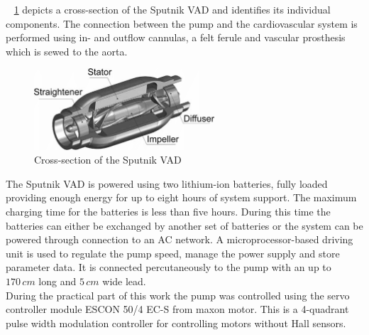 \figurename~ \ref{fig:sput_cross} depicts a cross-section of the Sputnik VAD and identifies its individual components.
The connection between the pump and the cardiovascular system is performed using in- and outflow cannulas, a felt ferule and vascular prosthesis which is sewed to the aorta. \cite{Sputnik1}
\begin{figure}[h]
  \centering
  \includegraphics[width=0.6\textwidth]{images/sputnik_cross.png}
  \caption[Cross-section of Sputnik VAD \cite{Sputnik6}]{Cross-section of the Sputnik VAD \cite{Sputnik6}}
  \label{fig:sput_cross}
\end{figure}
The Sputnik VAD is powered using two lithium-ion batteries, fully loaded providing enough energy for up to eight hours of system support. The maximum charging time for the batteries is less than five hours. During this time the batteries can either be exchanged by another set of batteries or the system can be powered through connection to an AC network. A microprocessor-based driving unit is used to regulate the pump speed, manage the power supply and store parameter data. It is connected percutaneously to the pump with an up to $170\, cm$ long and $5\, cm$ wide lead. \cite{Sputnik1}
\\During the practical part of this work the pump was controlled using the servo controller module ESCON 50/4 EC-S from maxon motor. This is a 4-quadrant pulse width modulation controller for controlling motors without Hall sensors.

